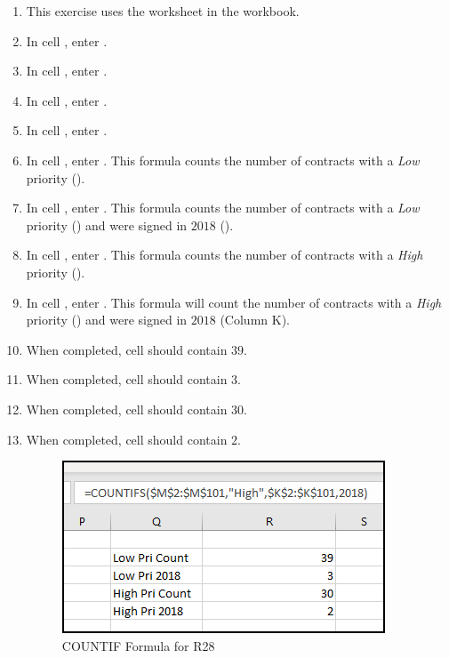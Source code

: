 \begin{enumbox}
	\begin{enumerate}
		\item This exercise uses the  worksheet in the  workbook.
		\item In cell , enter .
		\item In cell , enter .
		\item In cell , enter .
		\item In cell , enter .
		\item In cell , enter . This formula counts the number of contracts with a \textit{Low} priority ().
		\item In cell , enter . This formula counts the number of contracts with a \textit{Low} priority () and were signed in $ 2018 $ ().
		\item In cell , enter . This formula counts the number of contracts with a \textit{High} priority ().
		\item In cell , enter . This formula will count the number of contracts with a \textit{High} priority () and were signed in $ 2018 $ (Column K).
		\item When completed, cell  should contain $ 39 $.
		\item When completed, cell  should contain $ 3 $.
		\item When completed, cell  should contain $ 30 $.
		\item When completed, cell  should contain $ 2 $.
		
		\begin{figure}[H]
			\centering
			\includegraphics[width=\maxwidth{.75\linewidth}]{gfx/ch09_fig43}
			\caption{COUNTIF Formula for R28}
			\label{09:fig43}
		\end{figure}
			
	\end{enumerate}
\end{enumbox}
	
